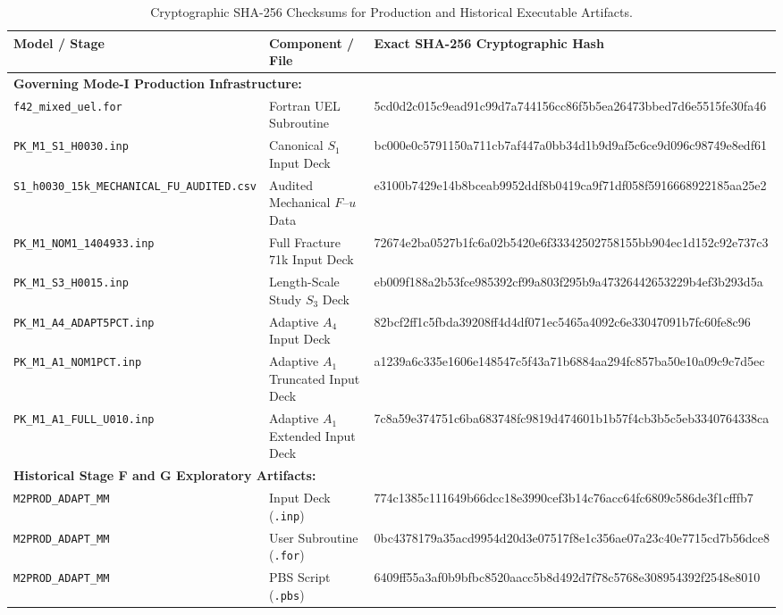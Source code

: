 \begin{table}[htbp]
\centering
\fontsize{7.0}{8.2}\selectfont
\setlength{\tabcolsep}{2.2pt}
\renewcommand{\arraystretch}{0.85}
\caption{Cryptographic SHA-256 Checksums for Production and Historical Executable Artifacts.}
\label{tab:app_checksums}
\begin{tabularx}{\textwidth}{lX>{\ttfamily\fontsize{5.4}{6.4}\selectfont}l}
\toprule
\textbf{Model / Stage} & \textbf{Component / File} & \textbf{Exact SHA-256 Cryptographic Hash} \\
\midrule
\multicolumn{3}{l}{\textbf{Governing Mode-I Production Infrastructure:}} \\
\texttt{f42\_mixed\_uel.for} & Fortran UEL Subroutine & 5cd0d2c015c9ead91c99d7a744156cc86f5b5ea26473bbed7d6e5515fe30fa46 \\
\texttt{PK\_M1\_S1\_H0030.inp} & Canonical $S_1$ Input Deck & bc000e0c5791150a711cb7af447a0bb34d1b9d9af5c6ce9d096c98749e8edf61 \\
\texttt{S1\_h0030\_15k\_MECHANICAL\_FU\_AUDITED.csv} & Audited Mechanical $F$--$u$ Data & e3100b7429e14b8bceab9952ddf8b0419ca9f71df058f5916668922185aa25e2 \\
\texttt{PK\_M1\_NOM1\_1404933.inp} & Full Fracture 71k Input Deck & 72674e2ba0527b1fc6a02b5420e6f33342502758155bb904ec1d152c92e737c3 \\
\texttt{PK\_M1\_S3\_H0015.inp} & Length-Scale Study $S_3$ Deck & eb009f188a2b53fce985392cf99a803f295b9a47326442653229b4ef3b293d5a \\
\texttt{PK\_M1\_A4\_ADAPT5PCT.inp} & Adaptive $A_4$ Input Deck & 82bcf2ff1c5fbda39208ff4d4df071ec5465a4092c6e33047091b7fc60fe8c96 \\
\texttt{PK\_M1\_A1\_NOM1PCT.inp} & Adaptive $A_1$ Truncated Input Deck & a1239a6c335e1606e148547c5f43a71b6884aa294fc857ba50e10a09c9c7d5ec \\
\texttt{PK\_M1\_A1\_FULL\_U010.inp} & Adaptive $A_1$ Extended Input Deck & 7c8a59e374751c6ba683748fc9819d474601b1b57f4cb3b5c5eb3340764338ca \\
\midrule
\multicolumn{3}{l}{\textbf{Historical Stage F and G Exploratory Artifacts:}} \\
\texttt{M2PROD\_ADAPT\_MM} & Input Deck (\texttt{.inp}) & 774c1385c111649b66dcc18e3990cef3b14c76acc64fc6809c586de3f1cfffb7 \\
\texttt{M2PROD\_ADAPT\_MM} & User Subroutine (\texttt{.for}) & 0bc4378179a35acd9954d20d3e07517f8e1c356ae07a23c40e7715cd7b56dce8 \\
\texttt{M2PROD\_ADAPT\_MM} & PBS Script (\texttt{.pbs}) & 6409ff55a3af0b9bfbc8520aacc5b8d492d7f78c5768e308954392f2548e8010 \\

\end{tabularx}
\end{table}
